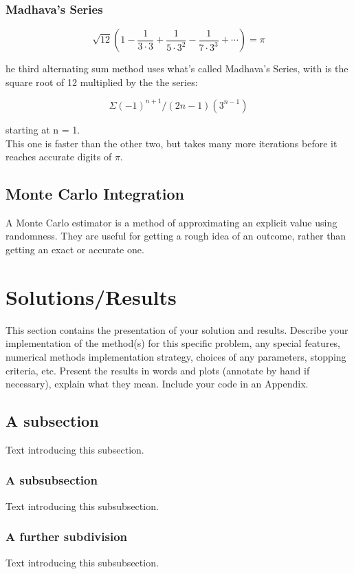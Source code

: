 \documentclass[11pt]{article}
\begin{document}
\subsubsection*{Madhava's Series}
\[\sqrt{12}\left(1 - \frac{1}{3\cdot 3} + \frac{1}{5\cdot 3^2} - \frac{1}{7\cdot 3^3} + \cdots\right) = \pi\]

he third alternating sum method uses what’s called Madhava’s Series, with is the square root of 12 multiplied by the the series:

\[\Sigma(-1)^{n+1} / (2n-1)(3^{n-1})\]

starting at n = 1.\\

This one is faster than the other two, but takes many more iterations before it reaches accurate digits of $\pi$.

\subsection{Monte Carlo Integration}\label{S:3.3}
A Monte Carlo estimator is a method of approximating an explicit value using randomness. They are useful for getting a rough idea of an outcome, rather than getting an exact or accurate one. 


\section{Solutions/Results}\label{S:4}
This section contains the presentation of your solution and results.
Describe your implementation of the method(s) for this specific problem, any special features, numerical methods implementation  strategy, choices of any parameters, stopping criteria, etc.
Present the results in words and plots (annotate by hand if necessary), explain what they mean. Include your code in an Appendix. 

\subsection{A subsection}
%
Text introducing this subsection. 

\subsubsection{A subsubsection}
%
Text introducing this subsubsection. 

\subsubsection{A further subdivision}
%
Text introducing this subsubsection. 
\end{document}
